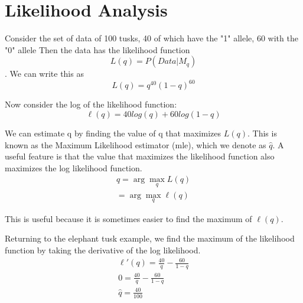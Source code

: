 \documentclass[12pt]{report}
\begin{document}

\maketitle

\vspace*{.1in}


\section{Likelihood Analysis}
Consider the set of data of 100 tusks, 40 of which have the "1" allele, 60 with the "0" allele
Then the data has the likelihood function \begin{equation} L(q) = P(Data|M_q)\end{equation}. We can write this as \begin{equation} L(q) = q^{40}(1-q)^{60}\end{equation}

Now consider the log of the likelihood function: \begin{equation} \ell(q) = 40log(q) + 60 log(1-q)\end{equation}

We can estimate q by finding the value of q that maximizes $L(q)$. This is known as the Maximum Likelihood estimator (mle), which we denote as $\hat{q}$. A useful feature is that the value that maximizes the likelihood function also maximizes the log likelihood function.
\newcommand{\argmax}{\arg\!\max}
\begin{equation}
\begin{aligned} \hat{q} = \argmax_q L(q) \\
= \argmax_q \ell(q)
\end{aligned} 
 \end{equation}

This is useful because it is sometimes easier to find the maximum of $\ell(q)$.

Returning to the elephant tusk example, we find the maximum of the likelihood function by taking the derivative of the log likelihood.
\begin{equation}
\begin{aligned}
\ell'(q) = \frac{40}{q} - \frac{60}{1-q}\\
0 = \frac{40}{q} - \frac{60}{1-q} \\
\hat{q} = \frac{40}{100}
\end{aligned}
\end{equation}
\end{document}
